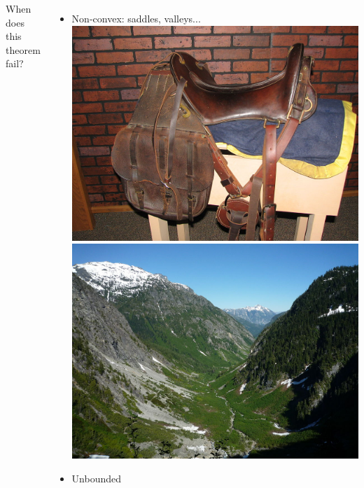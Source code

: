 \documentclass{beamer}
\begin{document}
\begin{frame}
\begin{columns}
When does this theorem fail?
\begin{itemize}
\item Non-convex: saddles, valleys...
\includegraphics[scale = 0.12]{figures/1024px-McCellan_Saddle_Fort_Kearny_2006_C.jpg}
\vspace{3}
\includegraphics[scale = 0.12]{figures/1024px-Stehekin_River_Valley.jpg}
\item Unbounded
\end{itemize}

\end{columns}

\end{frame}

\end{document}
